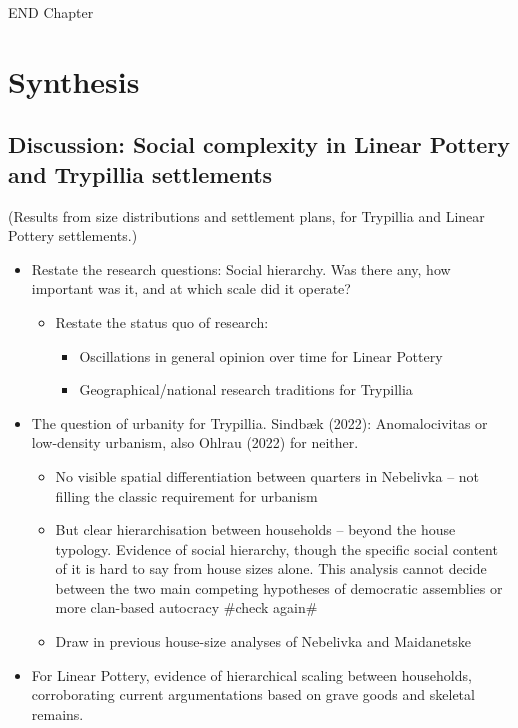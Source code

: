 \documentclass[
  12pt,
]{book}
\begin{document}
END Chapter

\hypertarget{part-synthesis}{%
\part{Synthesis}\label{part-synthesis}}

\hypertarget{disc-results}{%
\chapter{Discussion: Social complexity in Linear Pottery and Trypillia settlements}\label{disc-results}}

(Results from size distributions and settlement plans, for Trypillia and Linear Pottery settlements.)

\begin{itemize}
\item
  Restate the research questions: Social hierarchy. Was there any, how important was it, and at which scale did it operate?

  \begin{itemize}
  \item
    Restate the status quo of research:

    \begin{itemize}
    \item
      Oscillations in general opinion over time for Linear Pottery
    \item
      Geographical/national research traditions for Trypillia
    \end{itemize}
  \end{itemize}
\item
  The question of urbanity for Trypillia. Sindbæk (2022): Anomalocivitas or low-density urbanism, also Ohlrau (2022) for neither.

  \begin{itemize}
  \item
    No visible spatial differentiation between quarters in Nebelivka -- not filling the classic requirement for urbanism
  \item
    But clear hierarchisation between households -- beyond the house typology. Evidence of social hierarchy, though the specific social content of it is hard to say from house sizes alone. This analysis cannot decide between the two main competing hypotheses of democratic assemblies or more clan-based autocracy \#check again\#
  \item
    Draw in previous house-size analyses of Nebelivka and Maidanetske
  \end{itemize}
\item
  For Linear Pottery, evidence of hierarchical scaling between households, corroborating current argumentations based on grave goods and skeletal remains.


\end{itemize}
\end{document}
